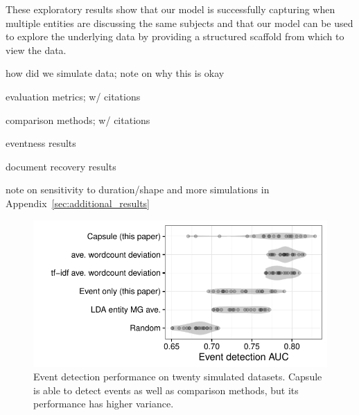 These exploratory results show that our model is successfully capturing when multiple entities are discussing the same subjects and that our model can be used to explore the underlying data by providing a structured scaffold from which to view the data.



\PP how did we simulate data; note on why this is okay

\PP evaluation metrics; w/ citations

\PP comparison methods; w/ citations

\PP eventness results

\PP document recovery results

\PP note on sensitivity to duration/shape and more simulations in Appendix~\ref{sec:additional_results}



\begin{figure}[h]
\centering
\includegraphics[width=\linewidth]{fig/sim_eventdetect.pdf}
\caption{Event detection performance on twenty simulated datasets.  Capsule is able to detect events as well as comparison methods, but its performance has higher variance.}
\label{fig:sim_eventdetect}
\end{figure}

